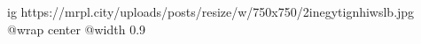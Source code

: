  
 
 
 
 

\ifcmt
  ig https://mrpl.city/uploads/posts/resize/w/750x750/2inegytignhiwslb.jpg
  @wrap center
  @width 0.9
\fi
